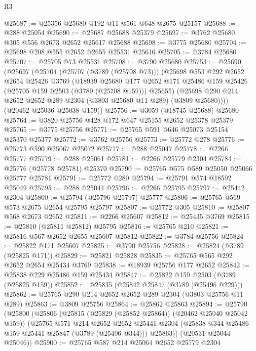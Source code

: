 \begin{lexlean}{R3}
\begin{coremodule}
@25687 := @25356 @25680 @192 @11 @561 @648 @2675 @25157
@25688 := @288 @25054
@25690 := @25687 @25688 @25379
@25697 := @3762 @25680 @305 @556 @2673 @2652 @25617 @25688
@25698 := @3775 @25680
@25704 := @25698 @208 @555 @2652 @2655 @25531 @25616
@25705 := @3784 @25680
@25707 := @25705 @73 @25531
@25708 := @3790 @25680
@25753 := @25690
    (@25697
      (@25704
        (@25707 (@3789 (@25708 @73)))
        (@25698
          @553
          @292
          @2652
          @2654
          @25426
          @3769
          (@18939
            @25680
            @177
            @2652
            @171
            @25486
            @159
            @25426
            (@25705 @159 @2503 (@3789 (@25708 @159)))
            @25655)
          (@25698 @290 @214 @2652 @2652 @289 @2304 (@3803 @25680 @11 @289) (@3809 @25680))))
      (@20462 @25036 @25038 @159))
@25756 := @3059 (@18745 @25688) @25680
@25764 := @3820 @25756 @428 @172 @647 @25155 @2652 @25378 @25379
@25765 := @3775 @25756
@25771 := @25765 @591 @646 @25073 @25154 @25370 @25377
@25772 := @3762 @25756
@25773 := @25772 @278
@25776 := @25773 @590 @25067 @25072
@25777 := @288 @25047
@25778 := @2266 @25777
@25779 := @288 @25061
@25781 := @2266 @25779 @2304
@25784 := @25776 (@25778 @25781) @25370
@25790 := @25765 @575 @589 @25050 @25066 @25777 @25781
@25791 := @25772 @280
@25794 := @25791 @574 @18592 @25049
@25795 := @288 @25044
@25796 := @2266 @25795
@25797 := @25442 @2304
@25800 := @25794 (@25796 @25797) @25777
@25806 := @25765 @569 @573 @2675 @2654 @25795 @25797
@25807 := @25772 @305
@25810 := @25807 @568 @2673 @2652
@25811 := @2266 @25607
@25812 := @25435 @3769
@25815 := @25810 (@25811 @25812) @25795
@25816 := @25765 @210
@25821 := @25816 @567 @2652 @2655 @25607 @25812
@25822 := @3784 @25756
@25824 := @25822 @171 @25607
@25825 := @3790 @25756
@25828 := @25824 (@3789 (@25825 @171))
@25829 := @25821 @25828
@25835 := @25765 @565 @292 @2652 @2654 @25434 @3769
@25838 := @18939 @25756 @177 @2652
@25842 := @25838 @229 @25486 @159 @25434
@25847 := @25822 @159 @2503 (@3789 (@25825 @159))
@25852 := @25835 (@25842 @25847 (@3789 (@25496 @229)))
@25862 := @25765 @290 @214 @2652 @2652 @289 @2304 (@3803 @25756 @11 @289)
@25863 := @3809 @25756
@25864 := @25862 @25863
@25894 := @25790
    (@25800
      (@25806
        (@25815 (@25829 (@25852 @25864)) (@20462 @25040 @25042 @159))
        (@25765
          @571
          @214
          @2652
          @2652
          @25441
          @2304
          (@25838 @344 @25486 @159 @25441 @25847 (@3789 (@25496 @344)))
          @25863))
      (@20531 @25044 @25046))
@25900 := @25765 @587 @214 @25064 @2652 @25779 @2304

\end{coremodule}
\end{lexlean}
